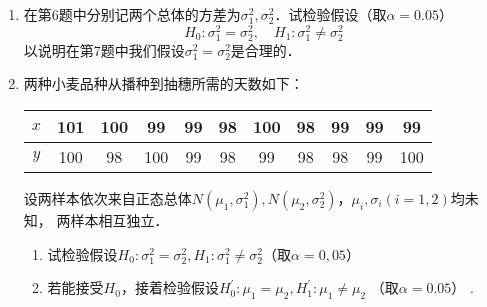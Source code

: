 \documentclass[10pt,a4paper]{article}
\begin{document}
\begin{enumerate}
    \item 在第6题中分别记两个总体的方差为$\sigma_1^2,\sigma_2^2$．试检验假设（取$\alpha=0.05$）
    $$H_0:\sigma_1^2=\sigma_2^2, \quad H_1:\sigma_1^2\neq \sigma^2_2$$
    以说明在第7题中我们假设$\sigma_1^2=\sigma_2^2$是合理的．




    \item 两种小麦品种从播种到抽穗所需的天数如下：
    \renewcommand{\arraystretch}{1.3}   
    \begin{table}[H]\centering
        \begin{tabular}{c|cccccccccc}
        $x$ & 101 & 100 & 99  & 99 & 98 & 100 & 98 & 99 & 99 & 99  \\ \hline
        $y$ & 100 & 98  & 100 & 99 & 98 & 99  & 98 & 98 & 99 & 100
        \end{tabular}
    \end{table}
    \renewcommand{\arraystretch}{1.0}
    设两样本依次来自正态总体$N(\mu_1,\sigma_1^2),N(\mu_2,\sigma_2^2)$，$\mu_i,\sigma_i(i=1,2)$均未知，
    两样本相互独立．
    \begin{enumerate}
        \item 试检验假设$H_0:\sigma_1^2=\sigma_2^2,H_1:\sigma_1^2\neq \sigma_2^2$（取$\alpha=0,05$）
        \item 若能接受$H_0$，接着检验假设$H^\prime_0:\mu_1=\mu_2,H^\prime_1:\mu_1\neq \mu_2$ （取$\alpha=0.05$） .
    \end{enumerate}



    


  

\end{enumerate}
\end{document}
